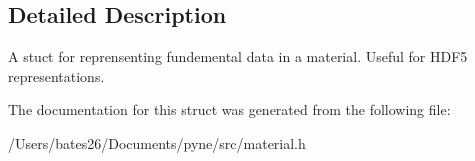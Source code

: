 \subsection{Detailed Description}
A stuct for reprensenting fundemental data in a material. Useful for H\+D\+F5 representations. 

The documentation for this struct was generated from the following file\+:\begin{DoxyCompactItemize}
\item 
/\+Users/bates26/\+Documents/pyne/src/material.\+h\end{DoxyCompactItemize}
